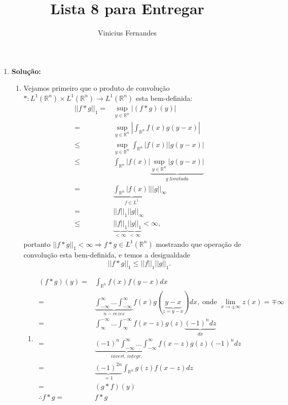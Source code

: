 \documentclass{article}
\begin{document}
	
	\title{Lista 8 para Entregar}
	\author{Vinicius Fernandes}
	
	\maketitle
	
	\begin{enumerate}
		
		\item \textbf{Solução:}
			\begin{enumerate}
				\item 
				Vejamos primeiro que o produto de convolução $* : L^{1}(\mathbb{R}^{n}) \times L^{1}(\mathbb{R}^{n}) \to L^{1}(\mathbb{R}^{n})$ esta bem-definida:
				$$
				\begin{aligned}
				||f*g||_{1}=& \sup_{y \in \mathbb{R}^{n}}|(f*g)(y)|
				\\
				= &\sup_{y \in \mathbb{R}^{n}}|\int_{\mathbb{R}^{n} }f(x)g(y-x)| 
				\\
				\leq & \sup_{y \in \mathbb{R}^{n}}\int_{\mathbb{R}^{n} }|f(x)||g(y-x)|
				\\
				\leq & \int_{\mathbb{R}^{n} }|f(x)| \underbrace{ \sup_{y \in \mathbb{R}^{n}}|g(y-x)| }_{g \; limitada}
				\\
				= & \underbrace{ \int_{\mathbb{R}^{n} }|f(x)| }_{f \in L^{1}}||g||_{\infty}
				\\
				= & ||f||_{1}||g||_{\infty}
				\\
				\leq & \underbrace{ ||f||_{1} }_{<\infty} \underbrace{ ||g||_{1} }_{<\infty} < \infty,
				\end{aligned} 
				$$
				portanto $||f*g||_{1} < \infty \Rightarrow f*g \in L^{1}(\mathbb{R}^{n})$ mostrando que operação de convolução esta bem-definida, e temos a desigualdade 
				$$
				||f*g||_{1}\leq ||f||_{1}||g||_{1}.
				$$
				
					\begin{enumerate}
						\item 
						
						$$
						\begin{aligned}
						(f*g)(y)
						= & \int_{\mathbb{R}^{n}}f(x)f(y-x)dx
						\\
						= & \underbrace{ \int_{-\infty}^{\infty}...\int_{-\infty}^{\infty} }_{n-vezes} f(x)g(\underbrace{ y-x }_{z=y-x})dx, \; \text{onde} \; \lim_{x \to \pm \infty} z(x) = \mp \infty
						\\
						=&  \int_{\infty}^{-\infty}...\int_{\infty}^{-\infty} f(x-z)g(z) \underbrace{ (-1)^{n}dz }_{dx}
						\\
						=&  \underbrace{(-1)^{n}  \int_{-\infty}^{\infty}...\int_{-\infty}^{\infty} }_{invert. \; integr.}f(x-z)g(z) (-1)^{n}dz
						\\
						= & \underbrace{ (-1)^{2n} }_{=1} \int_{\mathbb{R}^{n}}g(z)f(x-z)dz
						\\
						= & (g*f)(y)
						\\
						\therefore f*g = & f*g
						\end{aligned}
						$$
						

\end{enumerate}
\end{enumerate}
\end{enumerate}
\end{document}
